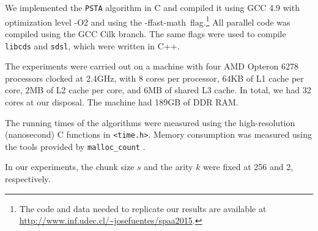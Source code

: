 We implemented the {\tt PSTA} algorithm in C and compiled it using GCC 4.9 with
optimization level -O2 and using the \mbox{-ffast-math flag}.\footnote{The code
  and data needed to replicate our results are available at
  \url{http://www.inf.udec.cl/~josefuentes/spaa2015}.}
All parallel code was compiled using the GCC Cilk branch.
The same flags were used to compile {\tt libcds} and {\tt sdsl}, which were
written in C++.

The experiments were carried out on a machine with four AMD
Opteron\texttrademark{} 6278 processors clocked at 2.4GHz,
with 8 cores per processor, 64KB of L1 cache per core, 2MB of L2 cache per core,
and 6MB of shared L3 cache.
In total, we had 32 cores at our disposal.
The machine had 189GB of DDR RAM.

The running times of the algorithms were measured using
the high-resolution (nanosecond) C functions in {\tt <time.h>}.
Memory consumption was measured using the tools provided by
{\tt malloc\_count} \cite{malloc-count}.

In our experiments, the chunk size $s$ and the arity $k$ were fixed at 256 and
2, respectively.
